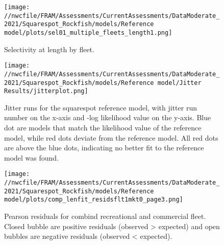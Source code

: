\documentclass[11pt,
  english,
  a4paper,
]{article}
\begin{document}
\tagmcend\tagstructend


\begin{figure}
\centering
\texttt{[image: //nwcfile/FRAM/Assessments/CurrentAssessments/DataModerate\_2021/Squarespot\_Rockfish/models/Reference model/plots/sel01\_multiple\_fleets\_length1.png]}
\caption{Selectivity at length by fleet.\label{fig:selex}}
\end{figure}

\tagmcend\tagstructend


\begin{figure}
\centering
\texttt{[image: //nwcfile/FRAM/Assessments/CurrentAssessments/DataModerate\_2021/Squarespot\_Rockfish/models/Reference model/Jitter Results/jitterplot.png]}
\caption{Jitter runs for the squarespot reference model, with jitter run number on the x-axis and -log likelihood value on the y-axis. Blue dot are models that match the likelihood value of the reference model, while red dots deviate from the reference model. All red dots are above the blue dots, indicating no better fit to the reference model was found.\label{fig:jitter_01}}
\end{figure}

\tagmcend\tagstructend


\begin{figure}
\centering
\texttt{[image: //nwcfile/FRAM/Assessments/CurrentAssessments/DataModerate\_2021/Squarespot\_Rockfish/models/Reference model/plots/comp\_lenfit\_residsflt1mkt0\_page3.png]}
\caption{Pearson residuals for combind recreational and commercial fleet. Closed bubble are positive residuals (observed \textgreater{} expected) and open bubbles are negative residuals (observed \textless{} expected).\label{fig:rec-com-pearson}}
\end{figure}
\end{document}
